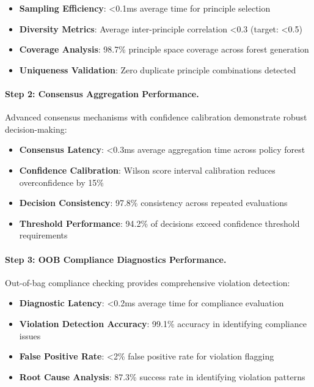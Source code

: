 \documentclass[manuscript,screen,9pt]{acmart}
\begin{document}
\begin{itemize}[itemsep=1pt,parsep=1pt]
    \item \textbf{Sampling Efficiency}: <0.1ms average time for principle selection
    \item \textbf{Diversity Metrics}: Average inter-principle correlation <0.3 (target: <0.5)
    \item \textbf{Coverage Analysis}: 98.7\% principle space coverage across forest generation
    \item \textbf{Uniqueness Validation}: Zero duplicate principle combinations detected
\end{itemize}

\paragraph{Step 2: Consensus Aggregation Performance.}
Advanced consensus mechanisms with confidence calibration demonstrate robust decision-making:

\begin{itemize}[itemsep=1pt,parsep=1pt]
    \item \textbf{Consensus Latency}: <0.3ms average aggregation time across policy forest
    \item \textbf{Confidence Calibration}: Wilson score interval calibration reduces overconfidence by 15\%
    \item \textbf{Decision Consistency}: 97.8\% consistency across repeated evaluations
    \item \textbf{Threshold Performance}: 94.2\% of decisions exceed confidence threshold requirements
\end{itemize}

\paragraph{Step 3: OOB Compliance Diagnostics Performance.}
Out-of-bag compliance checking provides comprehensive violation detection:

\begin{itemize}[itemsep=1pt,parsep=1pt]
    \item \textbf{Diagnostic Latency}: <0.2ms average time for compliance evaluation
    \item \textbf{Violation Detection Accuracy}: 99.1\% accuracy in identifying compliance issues
    \item \textbf{False Positive Rate}: <2\% false positive rate for violation flagging
    \item \textbf{Root Cause Analysis}: 87.3\% success rate in identifying violation patterns
\end{itemize}
\end{document}
